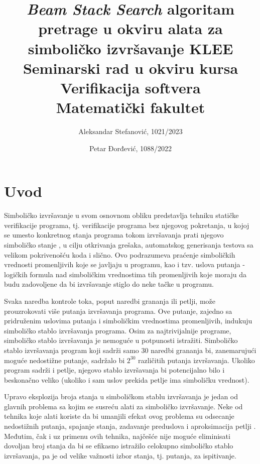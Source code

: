 \documentclass[a4paper]{article}
\title{\textit{Beam Stack Search} algoritam pretrage u okviru alata za simboličko izvršavanje KLEE\\ \small{Seminarski rad u okviru kursa\\Verifikacija softvera\\Matematički fakultet}}
\author{Aleksandar Stefanović, 1021/2023 \and Petar Đorđević, 1088/2022}
\begin{document}
\maketitle

\begin{abstract}

\end{abstract}

\tableofcontents

\newpage

\section{Uvod}

Simboličko izvršavanje u svom osnovnom obliku predstavlja tehniku statičke verifikacije programa, tj. verifikacije programa bez njegovog pokretanja, u kojoj se umesto konkretnog stanja programa tokom izvršavanja prati njegovo simboličko stanje \cite{SymExec-King-10.1145/360248.360252}, u cilju otkrivanja grešaka, automatskog generisanja testova sa velikom pokrivenošću koda i slično. Ovo podrazumeva praćenje simboličkih vrednosti promenljivih koje se javljaju u programu, kao i tzv. uslova putanja - logičkih formula nad simboličkim vrednostima tih promenljivih koje moraju da budu zadovoljene da bi izvršavanje stiglo do neke tačke u programu.

Svaka naredba kontrole toka, poput naredbi grananja ili petlji, može prouzrokovati više putanja izvršavanja programa. Ove putanje, zajedno sa pridruženim uslovima putanja i simboličkim vrednostima promenljivih, indukuju simboličko stablo izvršavanja programa. Osim za najtrivijalnije programe, simboličko stablo izvršavanja je nemoguće u potpunosti istražiti. Simboličko stablo izvršavanja program koji sadrži samo $30$ naredbi grananja bi, zanemarujući moguće nedostižne putanje, sadržalo bi $2^{30}$ različitih putanja izvršavanja. Ukoliko program sadrži i petlje, njegovo stablo izvršavanja bi potencijalno bilo i beskonačno veliko (ukoliko i sam uslov prekida petlje ima simboličku vrednost).

Upravo eksplozija broja stanja u simboličkom stablu izvršavanja je jedan od glavnih problema sa kojim se susreću alati za simboličko izvršavanje. Neke od tehnika koje alati koriste da bi umanjili efekat ovog problema su odsecanje nedostižnih putanja, spajanje stanja, zadavanje preduslova i aproksimacija petlji \cite{SurveySymExec-CSUR18}. Međutim, čak i uz primenu ovih tehnika, najčešće nije moguće eliminisati dovoljan broj stanja da bi se efikasno istražilo celokupno simboličko stablo izvršavanja, pa je od velike važnosti izbor stanja, tj. putanja, za ispitivanje.
\end{document}
